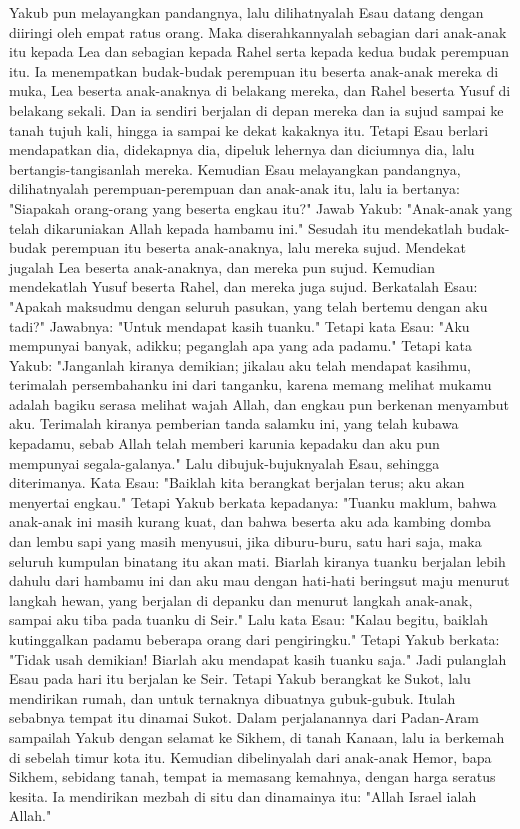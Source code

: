 \begin{biblechapter} %
 Yakub pun melayangkan pandangnya, lalu dilihatnyalah Esau datang dengan diiringi oleh empat ratus orang. Maka diserahkannyalah sebagian dari anak-anak itu kepada Lea dan sebagian kepada Rahel serta kepada kedua budak perempuan itu.
\verse Ia menempatkan budak-budak perempuan itu beserta anak-anak mereka di muka, Lea beserta anak-anaknya di belakang mereka, dan Rahel beserta Yusuf di belakang sekali.
\verse Dan ia sendiri berjalan di depan mereka dan ia sujud sampai ke tanah tujuh kali, hingga ia sampai ke dekat kakaknya itu.
\verse Tetapi Esau berlari mendapatkan dia, didekapnya dia, dipeluk lehernya dan diciumnya dia, lalu bertangis-tangisanlah mereka.
\verse Kemudian Esau melayangkan pandangnya, dilihatnyalah perempuan-perempuan dan anak-anak itu, lalu ia bertanya: "Siapakah orang-orang yang beserta engkau itu?" Jawab Yakub: "Anak-anak yang telah dikaruniakan Allah kepada hambamu ini."
\verse Sesudah itu mendekatlah budak-budak perempuan itu beserta anak-anaknya, lalu mereka sujud.
\verse Mendekat jugalah Lea beserta anak-anaknya, dan mereka pun sujud. Kemudian mendekatlah Yusuf beserta Rahel, dan mereka juga sujud.
\verse Berkatalah Esau: "Apakah maksudmu dengan seluruh pasukan, yang telah bertemu dengan aku tadi?" Jawabnya: "Untuk mendapat kasih tuanku."
\verse Tetapi kata Esau: "Aku mempunyai banyak, adikku; peganglah apa yang ada padamu."
\verse Tetapi kata Yakub: "Janganlah kiranya demikian; jikalau aku telah mendapat kasihmu, terimalah persembahanku ini dari tanganku, karena memang melihat mukamu adalah bagiku serasa melihat wajah Allah, dan engkau pun berkenan menyambut aku.
\verse Terimalah kiranya pemberian tanda salamku ini, yang telah kubawa kepadamu, sebab Allah telah memberi karunia kepadaku dan aku pun mempunyai segala-galanya." Lalu dibujuk-bujuknyalah Esau, sehingga diterimanya.
\verse Kata Esau: "Baiklah kita berangkat berjalan terus; aku akan menyertai engkau."
\verse Tetapi Yakub berkata kepadanya: "Tuanku maklum, bahwa anak-anak ini masih kurang kuat, dan bahwa beserta aku ada kambing domba dan lembu sapi yang masih menyusui, jika diburu-buru, satu hari saja, maka seluruh kumpulan binatang itu akan mati.
\verse Biarlah kiranya tuanku berjalan lebih dahulu dari hambamu ini dan aku mau dengan hati-hati beringsut maju menurut langkah hewan, yang berjalan di depanku dan menurut langkah anak-anak, sampai aku tiba pada tuanku di Seir."
\verse Lalu kata Esau: "Kalau begitu, baiklah kutinggalkan padamu beberapa orang dari pengiringku." Tetapi Yakub berkata: "Tidak usah demikian! Biarlah aku mendapat kasih tuanku saja."
\verse Jadi pulanglah Esau pada hari itu berjalan ke Seir.
\verse Tetapi Yakub berangkat ke Sukot, lalu mendirikan rumah, dan untuk ternaknya dibuatnya gubuk-gubuk. Itulah sebabnya tempat itu dinamai Sukot.
\verse Dalam perjalanannya dari Padan-Aram sampailah Yakub dengan selamat ke Sikhem, di tanah Kanaan, lalu ia berkemah di sebelah timur kota itu.
\verse Kemudian dibelinyalah dari anak-anak Hemor, bapa Sikhem, sebidang tanah, tempat ia memasang kemahnya, dengan harga seratus kesita.
\verse Ia mendirikan mezbah di situ dan dinamainya itu: "Allah Israel ialah Allah."
\end{biblechapter}

